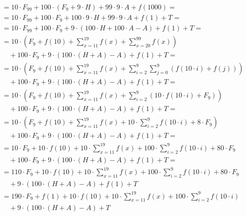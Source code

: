 \documentclass{article}
\begin{document}
\begin{equation*}
    \begin{split}
        & = 10 \cdot F_{99} + 100 \cdot (F_{9} + 9 \cdot H) + 99 \cdot 9 \cdot A + f(1000) = \\
        & = 10 \cdot F_{99} + 100 \cdot F_9 + 100 \cdot 9 \cdot H + 99 \cdot 9 \cdot A + f(1) + T = \\
        & = 10 \cdot F_{99} + 100 \cdot F_9 + 9 \cdot (100 \cdot H + 100 \cdot A - A) + f(1) + T = \\
        & = 10 \cdot (F_{9} + f(10) + \sum_{x=11}^{19}{f(x)} + \sum_{x=20}^{99}{f(x)}) \\
        & \quad + 100 \cdot F_9 + 9 \cdot (100 \cdot (H + A) - A) + f(1) + T = \\
        & = 10 \cdot (F_{9} + f(10) + \sum_{x=11}^{19}{f(x)} + \sum_{i=2}^{9}{ \sum_{j=0}^{9}{(f(10 \cdot i) + f(j)) } }) \\
        & \quad + 100 \cdot F_9 + 9 \cdot (100 \cdot (H + A) - A) + f(1) + T = \\
        & = 10 \cdot (F_{9} + f(10) + \sum_{x=11}^{19}{f(x)} + \sum_{i=2}^{9}{ (10 \cdot f(10 \cdot i) + F_{9} )} ) \\
        & \quad + 100 \cdot F_9 + 9 \cdot (100 \cdot (H + A) - A) + f(1) + T = \\
        & = 10 \cdot (F_{9} + f(10) + \sum_{x=11}^{19}{f(x)} + 10 \cdot \sum_{i=2}^{9}{ f(10 \cdot i)} + 8 \cdot F_{9} ) \\
        & \quad + 100 \cdot F_9 + 9 \cdot (100 \cdot (H + A) - A) + f(1) + T = \\
        & = 10 \cdot F_{9} + 10 \cdot f(10) + 10 \cdot \sum_{x=11}^{19}{f(x)} + 100 \cdot \sum_{i=2}^{9}{ f(10 \cdot i)} + 80 \cdot F_{9} \\
        & \quad + 100 \cdot F_9 + 9 \cdot (100 \cdot (H + A) - A) + f(1) + T = \\
        & = 110 \cdot F_{9} + 10 \cdot f(10) + 10 \cdot \sum_{x=11}^{19}{f(x)} + 100 \cdot \sum_{i=2}^{9}{ f(10 \cdot i)} + 80 \cdot F_{9} \\
        & \quad + 9 \cdot (100 \cdot (H + A) - A) + f(1) + T \\
        & = 190 \cdot F_{9} + f(1) + 10 \cdot f(10) + 10 \cdot \sum_{x=11}^{19}{f(x)} + 100 \cdot \sum_{i=2}^{9}{ f(10 \cdot i)} \\
        & \quad + 9 \cdot (100 \cdot (H + A) - A) + T
    \end{split}
\end{equation*}
\end{document}

